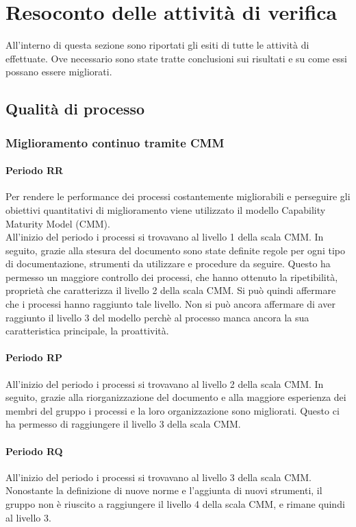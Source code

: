 \documentclass[PdQ.tex]{subfiles}
\begin{document}
\section{Resoconto delle attività di verifica}
All'interno di questa sezione sono riportati gli esiti di tutte le attività di  effettuate. Ove necessario sono state tratte conclusioni sui risultati e su come essi possano essere migliorati.

\subsection{Qualità di processo}
	\subsubsection{Miglioramento continuo tramite CMM}
		\paragraph{Periodo RR}
		Per rendere le performance dei processi costantemente migliorabili e perseguire gli obiettivi quantitativi di miglioramento viene utilizzato il modello Capability Maturity Model (CMM).\\
		All'inizio del periodo i processi si trovavano al livello 1 della scala CMM. In seguito, grazie alla stesura del documento \NPdocRR{} sono state definite regole per ogni tipo di documentazione, strumenti da utilizzare e procedure da seguire. Questo ha permesso un maggiore controllo dei processi, che hanno ottenuto la ripetibilità, proprietà che caratterizza il livello 2 della scala CMM. Si può quindi affermare che i processi hanno raggiunto tale livello. Non si può ancora affermare di aver raggiunto il livello 3 del modello perchè al processo manca ancora la sua caratteristica principale, la proattività.\\

\paragraph{Periodo RP}

		All'inizio del periodo i processi si trovavano al livello 2 della scala CMM. In seguito, grazie alla riorganizzazione del documento \NPdocRP{} e alla maggiore esperienza dei membri del gruppo i processi e la loro organizzazione sono migliorati. Questo ci ha permesso di raggiungere il livello 3 della scala CMM.

\paragraph{Periodo RQ}
	All'inizio del periodo i processi si trovavano al livello 3 della scala CMM. Nonostante la definizione di nuove norme e l'aggiunta di nuovi strumenti, il gruppo non è riuscito a raggiungere il livello 4 della scala CMM, e rimane quindi al livello 3.
\end{document}
